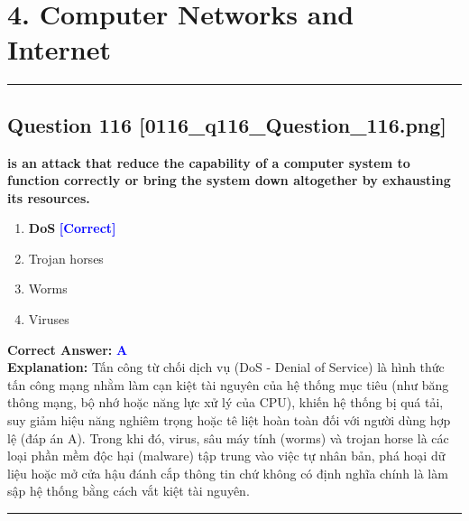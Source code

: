 \documentclass[11pt,a4paper]{article}
\begin{document}
\newpage
\section*{4. Computer Networks and Internet}
\hrule\vspace{0.5cm}

\begin{minipage}{\textwidth}
\subsection*{Question 116 \quad \footnotesize{[0116\_q116\_Question\_116.png]}}
\noindent \textbf{is an attack that reduce the capability of a computer system to function correctly or bring the system down altogether by exhausting its resources.}

\begin{enumerate}[label=\Alph*.]
    \item \textbf{DoS} \hfill \textcolor{blue}{\textbf{[Correct]}}
    \item Trojan horses
    \item Worms
    \item Viruses
\end{enumerate}

\noindent \textbf{Correct Answer:} \textcolor{blue}{\textbf{A}} \\[2pt]
\noindent \textbf{Explanation:} Tấn công từ chối dịch vụ (DoS - Denial of Service) là hình thức tấn công mạng nhằm làm cạn kiệt tài nguyên của hệ thống mục tiêu (như băng thông mạng, bộ nhớ hoặc năng lực xử lý của CPU), khiến hệ thống bị quá tải, suy giảm hiệu năng nghiêm trọng hoặc tê liệt hoàn toàn đối với người dùng hợp lệ (đáp án A). Trong khi đó, virus, sâu máy tính (worms) và trojan horse là các loại phần mềm độc hại (malware) tập trung vào việc tự nhân bản, phá hoại dữ liệu hoặc mở cửa hậu đánh cắp thông tin chứ không có định nghĩa chính là làm sập hệ thống bằng cách vắt kiệt tài nguyên.

\par\vspace{0.3cm}
\hrule
\vspace{0.3cm}
\end{minipage}
\end{document}
